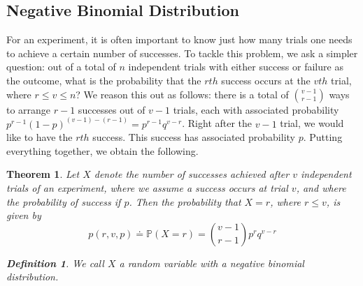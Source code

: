 \documentclass[12pt]{article}
\theoremstyle{plain}
\newtheorem{theorem}{Theorem}
\theoremstyle{definition}
\newtheorem*{definition}{Definition}
\theoremstyle{remark}
\numberwithin{equation}{section}  %
\begin{document}
\subsection{Negative Binomial Distribution}
For an experiment, it is often important to know just how many trials
one needs to achieve a certain number of successes. To tackle this problem,
we ask a simpler question: out of a total of $n$ independent trials with
either success or failure as the outcome, what is the probability
that the $rth$ success occurs at the $vth$ trial, where $r \le v \le n$?
We reason this out as follows: there is a total of $\binom{v-1}{r-1}$ ways to
arrange $r-1$ successes out of $v-1$ trials, each with associated probability
$p^{r-1}(1 - p)^{(v-1) - (r-1)} = p^{r-1}q^{v-r}$. Right after the $v-1$ trial, we would like to
have the $rth$ success. This success has associated probability $p$. Putting
everything together, we obtain the following.
\begin{theorem}
Let $X$ denote the number of successes achieved after $v$ independent trials of an experiment,
where we assume a success occurs at trial $v$, and where the probability
of success if $p$. Then the probability that $X=r$, where $r \le v$, is given by
\begin{equation*}
p(r, v, p) \doteq \mathbb{P}(X = r) = \binom{v-1}{r-1} p^{r} q^{v-r}
\end{equation*}
\begin{definition}
We call $X$ a random variable with a \emph{negative binomial distribution}.
\end{definition}
\end{theorem}
\end{document}
